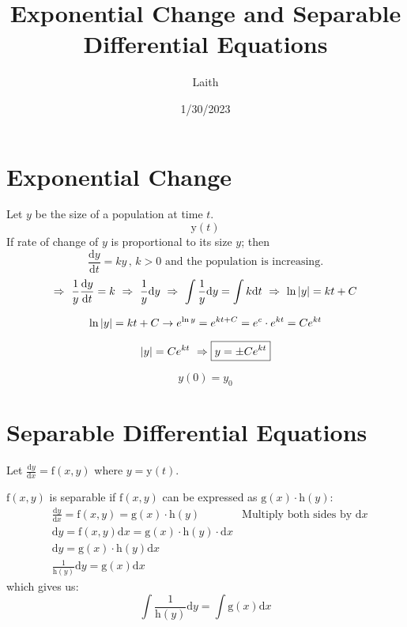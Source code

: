 \documentclass{article}
\author{Laith}
\title{Exponential Change and Separable Differential Equations}
\date{1/30/2023}
\newcommand{\diff}[1]{\frac{\mathrm{d}#1}{\mathrm{d}t}}
\newcommand{\dx}{\mathrm{d}x}
\newcommand{\dof}[1]{\mathrm{d}#1}
\newcommand{\dydx}[1]{\frac{\mathrm{d}#1}{\dx}}
\begin{document}
\maketitle

\section{Exponential Change}
Let $y$ be the size of a population at time $t$.
\[\mathrm{y}(t)\]
If rate of change of $y$ is proportional to its size $y$; then
\[\diff{y} = ky\,,\,k>0 \text{  and the population is increasing.}\]
\[
    \Rightarrow \,\, \frac{1}{y}\diff{y} = k \,\,
    \Rightarrow \,\, \frac{1}{y} \dof{y} \,\,
    \Rightarrow \,\, \int\frac{1}{y}\dof{y} = \int k\dof{t} \,\,
    \Rightarrow \,\, \ln\abs{y}=kt+C 
\]

\[
    \ln\abs{y}=kt+C\rightarrow e^{\ln y} = e^{kt+C}
    = e^c\cdot e^{kt}=Ce^{kt}
\]

\[\abs{y} = Ce^{kt} \,\, \Rightarrow \boxed{y=\pm Ce^{kt}}\]

\begin{center}
\end{center}
\[y(0) = y_0\]

\newpage
\section{Separable Differential Equations}
Let $\dydx{y} = \mathrm{f}(x, y)$ where $y=\mathrm{y}(t)$.

$\mathrm{f}(x, y)$ is separable if $\mathrm{f}(x, y)$ can be expressed as $\mathrm{g}(x)\cdot \mathrm{h}(y)$:
\begin{align}
    &\dydx{y} = \mathrm{f}(x, y)=\mathrm{g}(x)\cdot \mathrm{h}(y) &\text{Multiply both sides by $\dx$}\\
    &\dof{y} = \mathrm{f}(x, y)\dx=\mathrm{g}(x)\cdot \mathrm{h}(y)\cdot\dx &\\
    &\dof{y} = \mathrm{g}(x)\cdot \mathrm{h}(y)\dx &\\
    &\frac{1}{\mathrm{h}(y)}\dof{y} = \mathrm{g}(x)\dx &
\end{align}
which gives us:
\[\int \frac{1}{\mathrm{h}(y)}\dof{y} = \int \mathrm{g}(x)\dx\]
\end{document}
